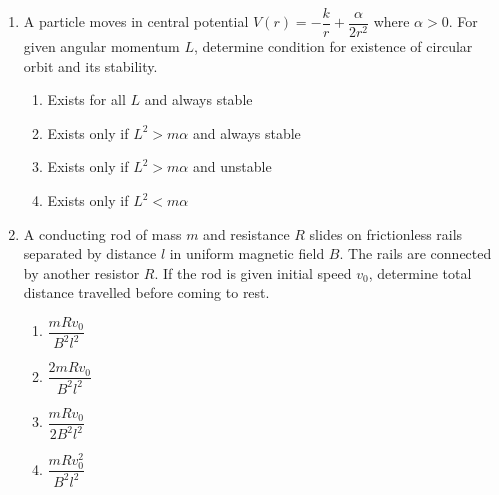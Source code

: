 \documentclass[12pt]{article}
\begin{document}
\begin{enumerate}
\begin{tikzpicture}[scale=1]
\end{tikzpicture}

\begin{enumerate}
\item $\sqrt{\dfrac{3g}{L}(1-\cos\theta)}$
\item $\sqrt{\dfrac{6g}{L}(1-\cos\theta)}$
\item $\sqrt{\dfrac{3g}{2L}(1-\cos\theta)}$
\item $\sqrt{\dfrac{2g}{L}(1-\cos\theta)}$
\end{enumerate}

\item A particle moves in central potential $V(r)=-\dfrac{k}{r}+\dfrac{\alpha}{2r^2}$ where $\alpha>0$. For given angular momentum $L$, determine condition for existence of circular orbit and its stability.

\begin{enumerate}
\item Exists for all $L$ and always stable
\item Exists only if $L^2>m\alpha$ and always stable
\item Exists only if $L^2>m\alpha$ and unstable
\item Exists only if $L^2<m\alpha$
\end{enumerate}

\item A conducting rod of mass $m$ and resistance $R$ slides on frictionless rails separated by distance $l$ in uniform magnetic field $B$. The rails are connected by another resistor $R$. If the rod is given initial speed $v_0$, determine total distance travelled before coming to rest.

\begin{center}
\end{center}

\begin{enumerate}
\item $\dfrac{mRv_0}{B^2l^2}$
\item $\dfrac{2mRv_0}{B^2l^2}$
\item $\dfrac{mRv_0}{2B^2l^2}$
\item $\dfrac{mRv_0^2}{B^2l^2}$
\end{enumerate}


\end{enumerate}
\end{document}
